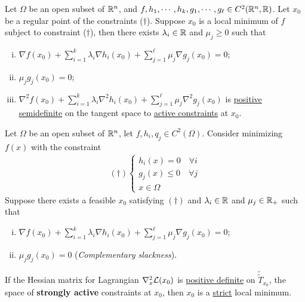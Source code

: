 \documentclass{article}
\newcommand{\ttilde}[1]{\tilde{\tilde{#1}}}
\begin{document}
    \begin{theorem}
        Let $\Omega$ be an open subset of $\mathbb{R}^n$, and $f, h_1, \cdots, h_k, g_1, \cdots, g_\ell \in C^2(\mathbb{R}^n, \mathbb{R})$. Let $x_0$ be a regular point of the constraints ($\dag$).
        Suppose $x_0$ is a local minimum of $f$ subject to constraint ($\dag$), then there exists $\lambda_i \in \mathbb{R}$ and $\mu_j \geq 0$ such that
        \begin{enumerate}[(i)]
            \item $\nabla f(x_0) + \sum_{i=1}^k \lambda_i \nabla h_i(x_0) + \sum_{j=1}^\ell \mu_j \nabla g_j(x_0) = 0$;
            \item $\mu_j g_j(x_0) = 0$;
            \item $\nabla^2 f(x_0) + \sum_{i=1}^k \lambda_i \nabla^2 h_i(x_0) + \sum_{j=1}^\ell \mu_j \nabla^2 g_j(x_0)$ is \ul{positive semidefinite} on the tangent space to \ul{active constraints} at $x_0$.
        \end{enumerate}
    \end{theorem}

    \begin{theorem}
        Let $\Omega$ be an open subset of $\mathbb{R}^n$, let $f, h_i, q_j \in C^2(\Omega)$. Consider minimizing $f(x)$ with the constraint
        \begin{align}
            (\dag ) \begin{cases}
                h_i(x) = 0\quad \forall i \\
                g_j(x) \leq 0\quad \forall j \\
                x \in \Omega
            \end{cases}
        \end{align}
        Suppose there exists a feasible $x_0$ satisfying $(\dag)$ and $\lambda_i \in \mathbb{R}$ and $\mu_j \in \mathbb{R}_{+}$ such that
        \begin{enumerate}[(i)]
            \item $\nabla f(x_0) + \sum_{i=1}^k \lambda_i \nabla h_i(x_0) + \sum_{j=1}^\ell \mu_j \nabla g_j(x_0) = 0$;
            \item $\mu_j g_j(x_0) = 0$ (\emph{Complementary slackness}).
        \end{enumerate}
        If the Hessian matrix for Lagrangian $\nabla_x^2 \mathcal{{L}}(x_0)$ is \ul{positive definite} on $\ttilde{T}_{x_0}$, the space of \textbf{strongly active} constraints at $x_0$, then $x_0$ is a \ul{strict} local minimum.
    \end{theorem}
\end{document}
